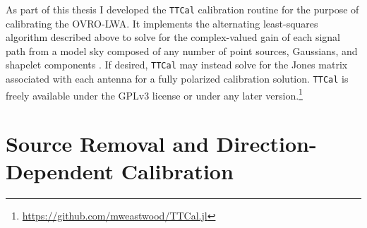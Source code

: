 \begin{bibunit}
As part of this thesis I developed the \texttt{TTCal} calibration routine for the purpose of
calibrating the OVRO-LWA. It implements the alternating least-squares algorithm described above to
solve for the complex-valued gain of each signal path from a model sky composed of any number of
point sources, Gaussians, and shapelet components \citep{2003MNRAS.338...35R}. If desired,
\texttt{TTCal} may instead solve for the Jones matrix associated with each antenna for a fully
polarized calibration solution. \texttt{TTCal} is freely available under the GPLv3 license or under
any later version.\footnote{
    \url{https://github.com/mweastwood/TTCal.jl}
}


\section{Source Removal and Direction-Dependent Calibration}


\end{bibunit}

